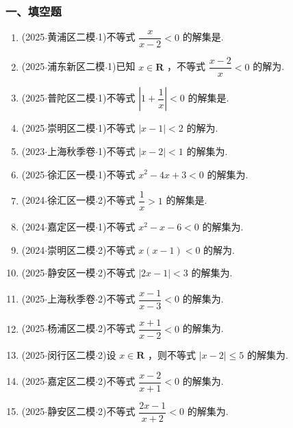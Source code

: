 \subsubsection*{一、填空题}
\begin{enumerate}
    \item (2025$\cdot$黄浦区二模$\cdot$1)不等式 $\dfrac{x}{x - 2} < 0$ 的解集是.
    \item (2025$\cdot$浦东新区二模$\cdot$1)已知 $x \in  \mathbf{R}$ ，不等式 $\dfrac{x - 2}{x} < 0$ 的解为.
    \item (2025$\cdot$普陀区二模$\cdot$1)不等式 $\left| {1 + \dfrac{1}{x}}\right|  < 0$ 的解集是.
    \item (2025$\cdot$崇明区二模$\cdot$1)不等式 $\left| {x - 1}\right|  < 2$ 的解为.
    \item (2023$\cdot$上海秋季卷$\cdot$1)不等式 $\left| {x - 2}\right|  < 1$ 的解集为.
    \item (2025$\cdot$徐汇区一模$\cdot$1)不等式 ${x}^{2} - {4x} + 3 < 0$ 的解集为.
    \item (2024$\cdot$徐汇区一模$\cdot$2)不等式 $\dfrac{1}{x} > 1$ 的解集是.
    \item (2024$\cdot$嘉定区一模$\cdot$1)不等式 ${x}^{2} - x - 6 < 0$ 的解集为.
    \item (2024$\cdot$崇明区二模$\cdot$2)不等式 $x\left( {x - 1}\right)  < 0$ 的解为.
    \item (2025$\cdot$静安区一模$\cdot$2)不等式 $\left| {{2x} - 1}\right|  < 3$ 的解集为.
    \item (2025$\cdot$上海秋季卷$\cdot$2)不等式 $\dfrac{x - 1}{x - 3} < 0$ 的解集为.
    \item (2025$\cdot$杨浦区二模$\cdot$2)不等式 $\dfrac{x + 1}{x - 2} < 0$ 的解集为.
    \item (2025$\cdot$闵行区二模$\cdot$2)设 $x \in  \mathbf{R}$ ，则不等式 $\left| {x - 2}\right|  \leq  5$ 的解集为.
    \item (2025$\cdot$嘉定区二模$\cdot$2)不等式 $\dfrac{x - 2}{x + 1} < 0$ 的解集为.
    \item (2025$\cdot$静安区二模$\cdot$2)不等式 $\dfrac{{2x} - 1}{x + 2} < 0$ 的解集为.

\end{enumerate}
